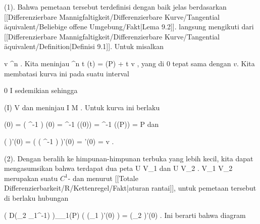 {

\teilbeweis {}{}{}
{(1). Bahwa pemetaan tersebut terdefinisi dengan baik jelas berdasarkan
[[Differenzierbare Mannigfaltigkeit/Differenzierbare Kurve/Tangential äquivalent/Beliebige offene Umgebung/Fakt|Lema 9.2]].
langsung mengikuti dari
[[Differenzierbare Mannigfaltigkeit/Differenzierbare Kurve/Tangential äquivalent/Definition|Definisi 9.1]].
Untuk
misalkan

\mavergleichskette
{\vergleichskette
{ v
}
{ \in }{ \R^n
}
{  }{
}
{    }{
}
{   }{
}
}
{}{}{.}
Kita meninjau
\maabbeledisp {\theta} { \R } { \R^n
} { t } { \theta(t) =  \alpha(P) + t v
} {,}
yang
di $0$ tepat sama dengan $v$. Kita membatasi kurva ini pada suatu interval

\mavergleichskette
{\vergleichskette
{ 0
}
{ \in }{ I
}
{ \subseteq }{ \R
}
{    }{
}
{   }{
}
}
{}{}{}
sedemikian sehingga

\mavergleichskette
{\vergleichskette
{ \theta(I)
}
{ \subseteq }{ V
}
{  }{
}
{    }{
}
{   }{
}
}
{}{}{}
dan meninjau
 { I } { M
} {.}
Untuk kurva ini berlaku

\mavergleichskettedisp
{\vergleichskette
{ \gamma(0)
}
{ =} { \left(  \alpha^{-1} \circ \theta  \right) (0)
}
{ =} { \alpha^{-1} (\theta(0))
}
{ =} { \alpha^{-1} (\alpha(P))
}
{ =} { P
}
}
{}{}{}
dan

\mavergleichskettedisp
{\vergleichskette
{ \left(  \alpha \circ \gamma  \right)'(0)
}
{ =} { \left(  \alpha \circ \left(  \alpha^{-1} \circ \theta  \right)  \right)'(0)
}
{ =} { \theta'(0)
}
{ =} { v
}
{ } {
}
}
{}{}{.}}
{}
\teilbeweis {}{}{}
{(2). Dengan beralih ke himpunan-himpunan terbuka yang lebih kecil, kita dapat mengasumsikan bahwa terdapat dua peta
 { U } { V_1
} {}
dan
 { U } { V_2
} {}
.
 { V_1 } { V_2
} {}
merupakan suatu
$C^1$-
dan menurut
[[Totale Differenzierbarkeit/R/Kettenregel/Fakt|aturan rantai]],
untuk
pemetaan tersebut di
berlaku hubungan

\mavergleichskettedisp
{\vergleichskette
{ \left(  D(\alpha_2 \circ \alpha_1^{-1})  \right)_{\alpha_1(P)} \left(   (\alpha_1 \circ \gamma)'(0)   \right)
}
{ =} { (\alpha_2 \circ \gamma)'(0)
}
{ } {
}
{ } {
}
{ } {
}
}
{}{}{.}
Ini berarti bahwa diagram

}}
